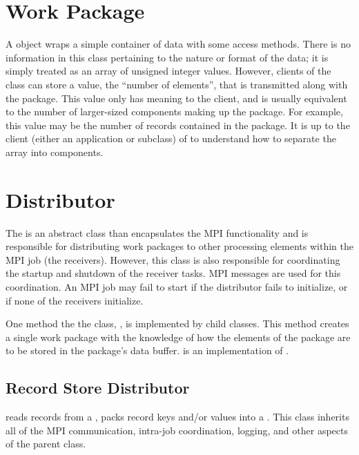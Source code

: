\section{Work Package}
\label{sec-workpackage}

A  object wraps a simple container of data
with some access methods. There is no information in this class pertaining to
the nature or format of the data; it is simply treated as an array of unsigned
integer values. However, clients of the class can store a value, the ``number
of elements'', that is transmitted along with the package. This value only
has meaning to the client, and is usually equivalent to the number of
larger-sized components making up the package. For example, this value may
be the number of records contained in the package. It is up to the client
(either an application or subclass) of  to understand
how to separate the array into components.

\section{Distributor}
\label{sec-workpackagedistributor}

The  is an abstract class than encapsulates the MPI
functionality and is responsible for distributing work packages to other
processing elements within the MPI job (the receivers). However, this class
is also responsible for coordinating the startup and shutdown of the receiver
tasks. MPI messages are used for this coordination. An MPI job may fail to
start if the distributor fails to initialize, or if none of the receivers
initialize.

One method the the  class, ,
is implemented by child classes. This method creates a single work package
with the knowledge of how the elements of the package are to be stored
in the package's data buffer.  is an
implementation of .

\subsection{Record Store Distributor}
\label{sec-recordstoredistributor}

 reads records from a ,
packs record keys and/or values into a . This class
inherits all of the MPI communication, intra-job coordination, logging,
and other aspects of the  parent class.

